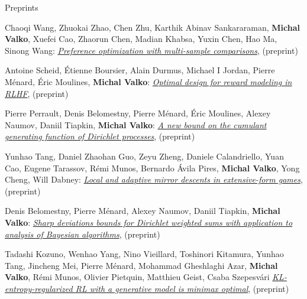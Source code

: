 \documentclass{resume}
\begin{document}
\begin{category}{Preprints}

\citembullet
Chaoqi Wang, Zhuokai Zhao, Chen Zhu, Karthik Abinav Sankararaman,  {\bf Michal Valko}, Xuefei Cao, Zhaorun Chen, Madian Khabsa, Yuxin Chen, Hao Ma, Sinong Wang: \href{https://arxiv.org/pdf/2410.12138}{\emph{Preference optimization with multi-sample comparisons}},
({\sf preprint}) 

\citembullet
Antoine Scheid, Étienne Boursier, Alain Durmus, Michael I Jordan, Pierre Ménard, Éric Moulines,  {\bf Michal Valko}:
\href{https://arxiv.org/pdf/2410.17055}{\emph{Optimal design for reward modeling in RLHF}},
({\sf preprint}) 

\citembullet
Pierre Perrault, Denis Belomestny, Pierre Ménard, Éric Moulines, Alexey Naumov, Daniil Tiapkin, {\bf Michal Valko}:
\href{https://arxiv.org/pdf/2409.18621}{\emph{A new bound on the cumulant generating function of Dirichlet processes}},
({\sf preprint}) 


\citembullet
Yunhao Tang, Daniel Zhaohan Guo, Zeyu Zheng, Daniele Calandriello, Yuan Cao, Eugene Tarassov,  R\' emi Munos, Bernardo  \' Avila Pires,  {\bf Michal Valko}, Yong Cheng, Will Dabney:
\href{https://arxiv.org/pdf/2405.08448.pdf}{\emph{Local and adaptive mirror descents in extensive-form games}},
({\sf preprint}) 





\citembullet
Denis Belomestny, Pierre Ménard, Alexey Naumov, Daniil Tiapkin,  {\bf Michal Valko}:
\href{https://arxiv.org/pdf/2304.03056.pdf}{\emph{Sharp deviations bounds for Dirichlet weighted sums with application to analysis of Bayesian algorithms}},
({\sf preprint}) 


\citembullet
Tadashi Kozuno, Wenhao Yang, Nino Vieillard, Toshinori Kitamura, Yunhao Tang, Jincheng Mei, Pierre M\' enard, Mohammad Gheshlaghi Azar, {\bf Michal Valko}, R\' emi Munos, Olivier Pietquin, Matthieu Geist, Csaba Szepesv\' ari
\href{https://arxiv.org/pdf/2205.14211.pdf}{\emph{KL-entropy-regularized RL with a generative model is minimax optimal}},
({\sf preprint}) 
\end{category}
\end{document}
